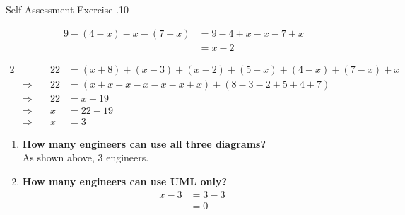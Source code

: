 \documentclass[../notes.tex]{subfiles}
\begin{document}
\begin{exercise}{Self Assessment Exercise \thechapter.10}
\begin{enumerate}
\begin{description}
								\begin{align*}
									9 - (4 - x) - x - (7 - x) &= 9 - 4 + x - x - 7 + x\\
									&= x - 2
								\end{align*}
						\end{description}
						\begin{alignat*}{2}
							& & 22 &= (x + 8) + (x - 3) + (x - 2) + (5 - x) + (4 - x) + (7 - x) + x\\
							& \Rightarrow \quad & 22 &= (x + x + x - x - x - x + x) + (8 - 3 - 2 + 5 + 4 + 7)\\
							& \Rightarrow \quad & 22 &= x + 19\\
							& \Rightarrow \quad & x &= 22 - 19\\
							& \Rightarrow \quad & x &= 3
						\end{alignat*}
						\begin{enumerate}
							\item \textbf{How many engineers can use all three diagrams?}\\
								As shown above, $3$ engineers.
							\item \textbf{How many engineers can use UML only?}
								\begin{align*}
									x - 3 &= 3 - 3\\
									&= 0
								\end{align*}
						\end{enumerate}
					\end{enumerate}
				\end{exercise}
\end{document}
